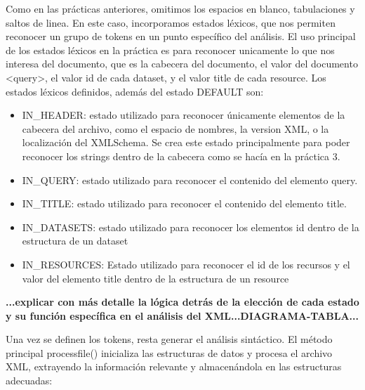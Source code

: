 Como en las prácticas anteriores, omitimos los espacios en blanco, tabulaciones y saltos de linea. En este caso, incorporamos estados léxicos, que nos permiten reconocer un grupo de tokens en un punto específico del análisis. 
El uso principal de los estados léxicos en la práctica es para reconocer unicamente lo que nos interesa del documento, que es la cabecera del documento, el valor del documento <query>, el valor id de cada dataset, y el valor title de cada resource. 
Los estados léxicos definidos, además del estado DEFAULT son:

\begin{itemize}
    \item IN\_HEADER: estado utilizado para reconocer únicamente elementos de la cabecera del archivo, como el espacio de nombres, la version XML, o la localización del XMLSchema. Se crea este estado principalmente para poder reconocer los strings dentro de la cabecera como se hacía en la práctica 3.
    \item IN\_QUERY: estado utilizado para reconocer el contenido del elemento query.
    \item IN\_TITLE: estado utilizado para reconocer el contenido del elemento title.
    \item IN\_DATASETS: estado utilizado para reconocer los elementos id dentro de la estructura de un dataset
    \item IN\_RESOURCES: Estado utilizado para reconocer el id de los recursos y el valor del elemento title dentro de la estructura de un resource
\end{itemize}

\textbf{...explicar con más detalle la lógica detrás de la elección de cada estado y su función específica en el análisis del XML...DIAGRAMA-TABLA...}


Una vez se definen los tokens, resta generar el análisis sintáctico. El método principal processfile() inicializa las estructuras de datos y procesa el archivo XML, extrayendo la información relevante y almacenándola en las estructuras adecuadas:

